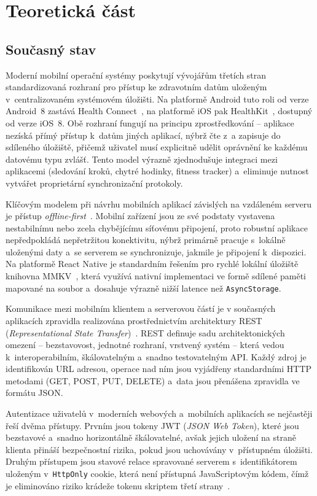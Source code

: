 \chapter{Teoretická část}

\section{Současný stav}

Moderní mobilní operační systémy poskytují vývojářům třetích stran standardizovaná
rozhraní pro přístup ke zdravotním datům uloženým v~centralizovaném systémovém
úložišti. Na platformě Android tuto roli od verze Android~8 zastává Health
Connect~\cite{healthconnect2024}, na platformě iOS pak HealthKit~\cite{healthkit2024},
dostupný od verze iOS~8. Obě rozhraní fungují na principu zprostředkování --
aplikace nezíská přímý přístup k~datům jiných aplikací, nýbrž čte z~a zapisuje do
sdíleného úložiště, přičemž uživatel musí explicitně udělit oprávnění ke každému
datovému typu zvlášť. Tento model výrazně zjednodušuje integraci mezi aplikacemi
(sledování kroků, chytré hodinky, fitness tracker) a~eliminuje nutnost vytvářet
proprietární synchronizační protokoly.

Klíčovým modelem při návrhu mobilních aplikací závislých na vzdáleném serveru
je přístup \textit{offline-first}~\cite{offlinefirst2015}. Mobilní zařízení jsou
ze své podstaty vystavena nestabilnímu nebo zcela chybějícímu síťovému připojení,
proto robustní aplikace nepředpokládá nepřetržitou konektivitu, nýbrž primárně
pracuje s~lokálně uloženými daty a~se serverem se synchronizuje, jakmile je připojení
k~dispozici. Na platformě React Native je standardním řešením pro rychlé lokální
úložiště knihovna MMKV~\cite{mmkv2024}, která využívá nativní implementaci ve formě
sdílené paměti mapované na soubor a~dosahuje výrazně nižší latence než
\texttt{AsyncStorage}.

Komunikace mezi mobilním klientem a serverovou částí je v současných aplikacích
zpravidla realizována prostřednictvím architektury REST 
(\textit{Representational State Transfer})~\cite{fielding2000rest}. REST definuje
sadu architektonických omezení -- bezstavovost, jednotné rozhraní, vrstvený systém --
která vedou k~interoperabilním, škálovatelným a~snadno testovatelným API. Každý
zdroj je identifikován URL adresou, operace nad ním jsou vyjádřeny standardními
HTTP metodami (GET, POST, PUT, DELETE) a~data jsou přenášena zpravidla ve formátu
JSON.

Autentizace uživatelů v~moderních webových a~mobilních aplikacích se nejčastěji
řeší dvěma přístupy. Prvním jsou tokeny JWT (\textit{JSON Web Token}), které jsou
bezstavové a~snadno horizontálně škálovatelné, avšak jejich uložení na straně
klienta přináší bezpečnostní rizika, pokud jsou uchovávány v~přístupném úložišti.
Druhým přístupem jsou stavové relace spravované serverem s~identifikátorem
uloženým v~\texttt{HttpOnly} cookie, která není přístupná JavaScriptovým kódem,
čímž je eliminováno riziko krádeže tokenu skriptem třetí strany~\cite{owasp2024mobile}.

